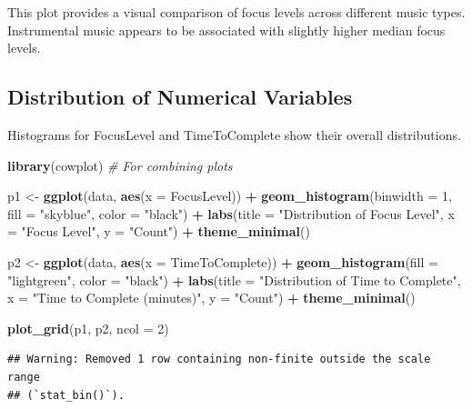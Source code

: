 \documentclass[
]{article}
\newenvironment{Shaded}{\begin{snugshade}}{\end{snugshade}}
\newcommand{\AttributeTok}[1]{\textcolor[rgb]{0.13,0.29,0.53}{#1}}
\newcommand{\CommentTok}[1]{\textcolor[rgb]{0.56,0.35,0.01}{\textit{#1}}}
\newcommand{\DecValTok}[1]{\textcolor[rgb]{0.00,0.00,0.81}{#1}}
\newcommand{\FunctionTok}[1]{\textcolor[rgb]{0.13,0.29,0.53}{\textbf{#1}}}
\newcommand{\NormalTok}[1]{#1}
\newcommand{\OtherTok}[1]{\textcolor[rgb]{0.56,0.35,0.01}{#1}}
\newcommand{\SpecialCharTok}[1]{\textcolor[rgb]{0.81,0.36,0.00}{\textbf{#1}}}
\newcommand{\StringTok}[1]{\textcolor[rgb]{0.31,0.60,0.02}{#1}}
\begin{document}
This plot provides a visual comparison of focus levels across different
music types. Instrumental music appears to be associated with slightly
higher median focus levels.

\subsection{Distribution of Numerical
Variables}\label{distribution-of-numerical-variables}

Histograms for FocusLevel and TimeToComplete show their overall
distributions.

\begin{Shaded}
\begin{Highlighting}[]
\FunctionTok{library}\NormalTok{(cowplot) }\CommentTok{\# For combining plots}

\NormalTok{p1 }\OtherTok{\textless{}{-}} \FunctionTok{ggplot}\NormalTok{(data, }\FunctionTok{aes}\NormalTok{(}\AttributeTok{x =}\NormalTok{ FocusLevel)) }\SpecialCharTok{+}
  \FunctionTok{geom\_histogram}\NormalTok{(}\AttributeTok{binwidth =} \DecValTok{1}\NormalTok{, }\AttributeTok{fill =} \StringTok{"skyblue"}\NormalTok{, }\AttributeTok{color =} \StringTok{"black"}\NormalTok{) }\SpecialCharTok{+}
  \FunctionTok{labs}\NormalTok{(}\AttributeTok{title =} \StringTok{"Distribution of Focus Level"}\NormalTok{, }\AttributeTok{x =} \StringTok{"Focus Level"}\NormalTok{, }\AttributeTok{y =} \StringTok{"Count"}\NormalTok{) }\SpecialCharTok{+}
  \FunctionTok{theme\_minimal}\NormalTok{()}

\NormalTok{p2 }\OtherTok{\textless{}{-}} \FunctionTok{ggplot}\NormalTok{(data, }\FunctionTok{aes}\NormalTok{(}\AttributeTok{x =}\NormalTok{ TimeToComplete)) }\SpecialCharTok{+}
  \FunctionTok{geom\_histogram}\NormalTok{(}\AttributeTok{fill =} \StringTok{"lightgreen"}\NormalTok{, }\AttributeTok{color =} \StringTok{"black"}\NormalTok{) }\SpecialCharTok{+}
  \FunctionTok{labs}\NormalTok{(}\AttributeTok{title =} \StringTok{"Distribution of Time to Complete"}\NormalTok{, }\AttributeTok{x =} \StringTok{"Time to Complete (minutes)"}\NormalTok{, }\AttributeTok{y =} \StringTok{"Count"}\NormalTok{) }\SpecialCharTok{+}
  \FunctionTok{theme\_minimal}\NormalTok{()}

\FunctionTok{plot\_grid}\NormalTok{(p1, p2, }\AttributeTok{ncol =} \DecValTok{2}\NormalTok{)}
\end{Highlighting}
\end{Shaded}

\begin{verbatim}
## Warning: Removed 1 row containing non-finite outside the scale range
## (`stat_bin()`).
\end{verbatim}
\end{document}
